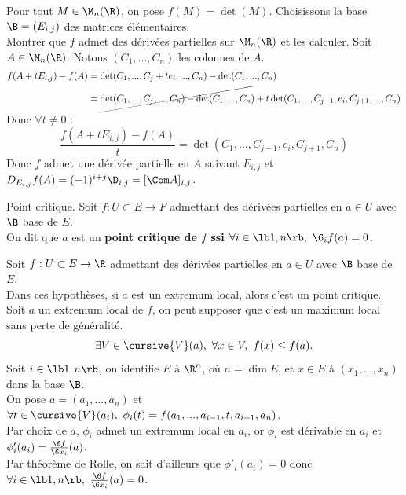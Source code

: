 \documentclass[11pt]{article}
\begin{document}
\begin{exercice}{}{}
    Pour tout $M\in\M_n(\R)$, on pose $f(M)=\det(M)$. Choisissons la base $\B=(E_{i,j})$ des matrices élémentaires.\\
    Montrer que $f$ admet des dérivées partielles sur $\M_n(\R)$ et les calculer.
    \tcblower
    Soit $A\in\M_n(\R)$. Notons $(C_1,...,C_n)$ les colonnes de $A$.
    \begin{align*}
        f(A+t E_{i,j}) - f(A) &= \det(C_1,...,C_j + t e_i, ..., C_n) - \det(C_1,...,C_n)\\
        &=\cancel{\det(C_1,...,C_j, ..., C_n) - \det(C_1,...,C_n)} + t\det(C_1,...,C_{j-1}, e_i, C_{j+1}, ..., C_n)
    \end{align*}
    Donc $\forall t \neq 0$ : 
    \begin{equation*}
        \frac{f(A+tE_{i,j})-f(A)}{t} = \det(C_1,...,C_{j-1}, e_i, C_{j+1}, C_n)
    \end{equation*}
    Donc $f$ admet une dérivée partielle en $A$ suivant $E_{i,j}$ et $D_{E_{i,j}}f(A)=(-1)^{i+j}\D_{i,j}=[\Com A]_{i,j}$.
\end{exercice}

\vspace*{-0.8cm}

\begin{defi}{Point critique.}{}
    Soit $f:U\subset E \to F$ admettant des dérivées partielles en $a\in U$ avec $\B$ base de $E$.\\
    On dit que $a$ est un \bf{point critique} de $f$ ssi $\forall i \in \lb1,n\rb, ~ \6_if(a)=0$.
\end{defi}

\vspace*{-0.8cm}

\begin{prop}{}{}
    Soit $f:U\subset E \to \R$ admettant des dérivées partielles en $a\in U$ avec $\B$ base de $E$.\\
    Dans ces hypothèses, si $a$ est un extremum local, alors c'est un point critique.
    \tcblower
    Soit $a$ un extremum local de $f$, on peut supposer que c'est un maximum local sans perte de généralité.
    \begin{equation*}
        \exists V \in \cursive{V}(a), ~ \forall x \in V, ~ f(x) \leq f(a).
    \end{equation*}
    Soit $i\in\lb1,n\rb$, on identifie $E$ à $\R^n$, où $n=\dim E$, et $x\in E$ à $(x_1,...,x_n)$ dans la base $\B$.\\
    On pose $a=(a_1,...,a_n)$ et $\forall t \in \cursive{V}(a_i), ~ \phi_i(t)=f(a_1,...,a_{i-1},t,a_{i+1},a_n)$.\\
    Par choix de $a$, $\phi_i$ admet un extremum local en $a_i$, or $\phi_i$ est dérivable en $a_i$ et $\phi'_i(a_i)=\frac{\6 f}{\6 x_i}(a)$.\\
    Par théorème de Rolle, on sait d'ailleurs que $\phi'_i(a_i)=0$ donc $\forall i \in \lb1,n\rb, ~ \frac{\6 f}{\6 x_i}(a)=0$.
\end{prop}
\end{document}

